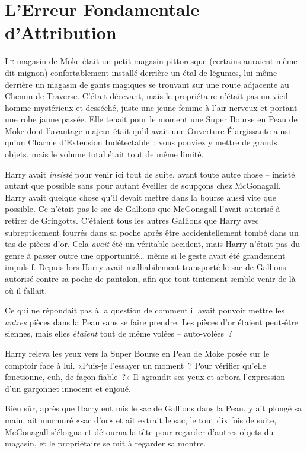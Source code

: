 \chapter{L'Erreur Fondamentale d'Attribution}

\lettrine{L}{e} magasin de Moke était un petit magasin pittoresque (certains auraient même dit mignon) confortablement installé derrière un étal de légumes, lui-même derrière un magasin de gants magiques se trouvant sur une route adjacente au Chemin de Traverse. C'était décevant, mais le propriétaire n'était pas un vieil homme mystérieux et desséché, juste une jeune femme à l'air nerveux et portant une robe jaune passée. Elle tenait pour le moment une Super Bourse en Peau de Moke  dont l'avantage majeur était qu'il avait une Ouverture Élargissante ainsi qu'un Charme d'Extension Indétectable~: vous pouviez y mettre de grands objets, mais le volume total était tout de même limité.

Harry avait \emph{insisté} pour venir ici tout de suite, avant toute autre chose -- insisté autant que possible sans pour autant éveiller de soupçons chez McGonagall. Harry avait quelque chose qu'il devait mettre dans la bourse aussi vite que possible. Ce n'était pas le sac de Gallions que McGonagall l'avait autorisé à retirer de Gringotts. C'étaient tous les autres Gallions que Harry avec subrepticement fourrés dans sa poche après être accidentellement tombé dans un tas de pièces d'or. Cela \emph{avait} été un véritable accident, mais Harry n'était pas du genre à passer outre une opportunité… même si le geste avait été grandement impulsif. Depuis lors Harry avait malhabilement transporté le sac de Gallions autorisé contre sa poche de pantalon, afin que tout tintement semble venir de là où il fallait.

Ce qui ne répondait pas à la question de comment il avait pouvoir mettre les \emph{autres} pièces dans la Peau sans se faire prendre. Les pièces d'or étaient peut-être siennes, mais elles \emph{étaient} tout de même volées -- auto-volées~?

Harry releva les yeux vers la Super Bourse en Peau de Moke  posée sur le comptoir face à lui. «Puis-je l'essayer un moment~? Pour vérifier qu'elle fonctionne, euh, de façon fiable~?» Il agrandit ses yeux et arbora l'expression d'un garçonnet innocent et enjoué.

Bien sûr, après que Harry eut mis le sac de Gallions dans la Peau, y ait plongé sa main, ait murmuré «sac d'or» et ait extrait le sac, le tout dix fois de suite, McGonagall s'éloigna et détourna la tête pour regarder d'autres objets du magasin, et le propriétaire se mit à regarder sa montre.

